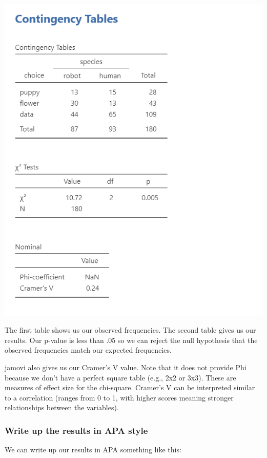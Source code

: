 \documentclass[
]{book}
\begin{document}
\includegraphics{images/11-independence/independence_results.png}

The first table shows us our observed frequencies. The second table gives us our results. Our p-value is less than .05 so we can reject the null hypothesis that the observed frequencies match our expected frequencies.

jamovi also gives us our Cramer's V value. Note that it does not provide Phi because we don't have a perfect square table (e.g., 2x2 or 3x3). These are measures of effect size for the chi-square. Cramer's V can be interpreted similar to a correlation (ranges from 0 to 1, with higher scores meaning stronger relationships between the variables).

\hypertarget{write-up-the-results-in-apa-style-4}{%
\subsubsection{Write up the results in APA style}\label{write-up-the-results-in-apa-style-4}}

We can write up our results in APA something like this:
\end{document}
